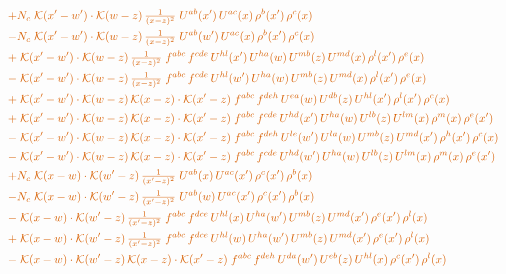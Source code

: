 \documentclass[10pt]{article}
\numberwithin{equation}{section}
\begin{document}
\begin{align}
&\quad{\color{BFK}+N_c\;\mathcal{K}(x'-w')\cdot\mathcal{K}(w-z)\,\tfrac{1}{(x-z)^{2}}\;U^{ab}(x')\,U^{ac}(x)\,\rho^{b}(x')\,\rho^{c}(x)}\notag\\
&\quad{\color{BFK}-N_c\;\mathcal{K}(x'-w')\cdot\mathcal{K}(w-z)\,\tfrac{1}{(x-z)^{2}}\;U^{ab}(w')\,U^{ac}(x)\,\rho^{b}(x')\,\rho^{c}(x)}\notag\\
&\quad{\color{BFK}+\;\mathcal{K}(x'-w')\cdot\mathcal{K}(w-z)\,\tfrac{1}{(x-z)^{2}}\;f^{abc}\,f^{cde}\,U^{hl}(x')\,U^{ha}(w)\,U^{mb}(z)\,U^{md}(x)\,\rho^{l}(x')\,\rho^{e}(x)}\notag\\
&\quad{\color{BFK}-\;\mathcal{K}(x'-w')\cdot\mathcal{K}(w-z)\,\tfrac{1}{(x-z)^{2}}\;f^{abc}\,f^{cde}\,U^{hl}(w')\,U^{ha}(w)\,U^{mb}(z)\,U^{md}(x)\,\rho^{l}(x')\,\rho^{e}(x)}\notag\\
&\quad{\color{BFK}+\;\mathcal{K}(x'-w')\cdot\mathcal{K}(w-z)\,\mathcal{K}(x-z)\cdot\mathcal{K}(x'-z)\;f^{abc}\,f^{deh}\,U^{ea}(w)\,U^{db}(z)\,U^{hl}(x')\,\rho^{l}(x')\,\rho^{c}(x)}\notag\\
&\quad{\color{BFK}+\;\mathcal{K}(x'-w')\cdot\mathcal{K}(w-z)\,\mathcal{K}(x-z)\cdot\mathcal{K}(x'-z)\;f^{abc}\,f^{cde}\,U^{hd}(x')\,U^{ha}(w)\,U^{lb}(z)\,U^{lm}(x)\,\rho^{m}(x)\,\rho^{e}(x')}\notag\\
&\quad{\color{BFK}-\;\mathcal{K}(x'-w')\cdot\mathcal{K}(w-z)\,\mathcal{K}(x-z)\cdot\mathcal{K}(x'-z)\;f^{abc}\,f^{deh}\,U^{le}(w')\,U^{la}(w)\,U^{mb}(z)\,U^{md}(x')\,\rho^{h}(x')\,\rho^{c}(x)}\notag\\
&\quad{\color{BFK}-\;\mathcal{K}(x'-w')\cdot\mathcal{K}(w-z)\,\mathcal{K}(x-z)\cdot\mathcal{K}(x'-z)\;f^{abc}\,f^{cde}\,U^{hd}(w')\,U^{ha}(w)\,U^{lb}(z)\,U^{lm}(x)\,\rho^{m}(x)\,\rho^{e}(x')}\notag\\
&\quad{\color{BFK}+N_c\;\mathcal{K}(x-w)\cdot\mathcal{K}(w'-z)\,\tfrac{1}{(x'-z)^{2}}\;U^{ab}(x)\,U^{ac}(x')\,\rho^{c}(x')\,\rho^{b}(x)}\notag\\
&\quad{\color{BFK}-N_c\;\mathcal{K}(x-w)\cdot\mathcal{K}(w'-z)\,\tfrac{1}{(x'-z)^{2}}\;U^{ab}(w)\,U^{ac}(x')\,\rho^{c}(x')\,\rho^{b}(x)}\notag\\
&\quad{\color{BFK}-\;\mathcal{K}(x-w)\cdot\mathcal{K}(w'-z)\,\tfrac{1}{(x'-z)^{2}}\;f^{abc}\,f^{dce}\,U^{hl}(x)\,U^{ha}(w')\,U^{mb}(z)\,U^{md}(x')\,\rho^{e}(x')\,\rho^{l}(x)}\notag\\
&\quad{\color{BFK}+\;\mathcal{K}(x-w)\cdot\mathcal{K}(w'-z)\,\tfrac{1}{(x'-z)^{2}}\;f^{abc}\,f^{dce}\,U^{hl}(w)\,U^{ha}(w')\,U^{mb}(z)\,U^{md}(x')\,\rho^{e}(x')\,\rho^{l}(x)}\notag\\
&\quad{\color{BFK}-\;\mathcal{K}(x-w)\cdot\mathcal{K}(w'-z)\,\mathcal{K}(x-z)\cdot\mathcal{K}(x'-z)\;f^{abc}\,f^{deh}\,U^{da}(w')\,U^{eb}(z)\,U^{hl}(x)\,\rho^{c}(x')\,\rho^{l}(x)}\notag\\

\end{align}
\end{document}
